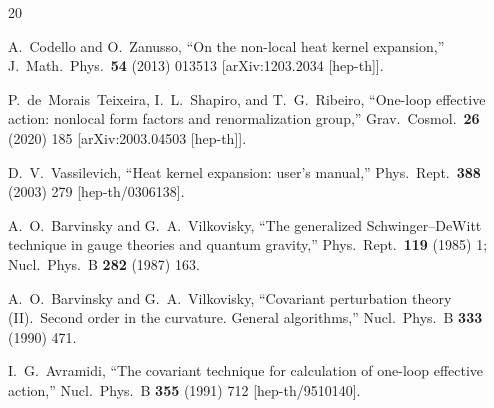 \documentclass[12pt,a4paper]{article}
\theoremstyle{definition}
\theoremstyle{remark}
\begin{document}
\begin{thebibliography}{20}

A.~Codello and O.~Zanusso,
``On the non-local heat kernel expansion,''
J.\ Math.\ Phys.\ \textbf{54} (2013) 013513
[arXiv:1203.2034 [hep-th]].

P.~de~Morais~Teixeira, I.~L.~Shapiro, and T.~G.~Ribeiro,
``One-loop effective action: nonlocal form factors and
renormalization group,''
Grav.\ Cosmol.\ \textbf{26} (2020) 185
[arXiv:2003.04503 [hep-th]].

D.~V.~Vassilevich,
``Heat kernel expansion: user's manual,''
Phys.\ Rept.\ \textbf{388} (2003) 279
[hep-th/0306138].

A.~O.~Barvinsky and G.~A.~Vilkovisky,
``The generalized Schwinger--DeWitt technique in gauge theories
and quantum gravity,''
Phys.\ Rept.\ \textbf{119} (1985) 1;
Nucl.\ Phys.\ B \textbf{282} (1987) 163.

A.~O.~Barvinsky and G.~A.~Vilkovisky,
``Covariant perturbation theory (II).\ Second order in the curvature.
General algorithms,''
Nucl.\ Phys.\ B \textbf{333} (1990) 471.

I.~G.~Avramidi,
``The covariant technique for calculation of one-loop effective
action,''
Nucl.\ Phys.\ B \textbf{355} (1991) 712
[hep-th/9510140].

\end{thebibliography}
\end{document}
